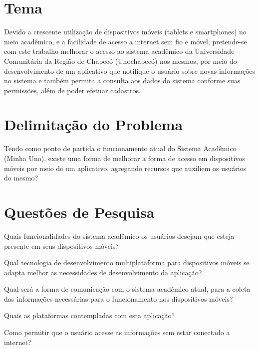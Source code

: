 \section{Tema}
Devido a crescente utilização de dispositivos móveis (tablets e smartphones) no meio acadêmico, e a facilidade de acesso a internet sem fio e móvel, pretende-se com este trabalho melhorar o acesso ao sistema acadêmico da Universidade Comunitária da Região de Chapecó (Unochapecó) nos mesmos, por meio do desenvolvimento de um aplicativo que notifique o usuário sobre novas informações no sistema e também permita a consulta aos dados do sistema conforme suas permissões, além de poder efetuar cadastros.

\section{Delimitação do Problema}
Tendo como ponto de partida o funcionamento atual do Sistema Acadêmico (Minha Uno), existe uma forma de melhorar a forma de acesso em dispositivos móveis por meio de um aplicativo, agregando recursos que auxiliem os usuários do mesmo?

\section{Questões de Pesquisa}
Quais funcionalidades do sistema acadêmico os usuários desejam que esteja presente em seus dispositivos móveis? 

Qual tecnologia de desenvolvimento multiplataforma para dispositivos móveis se adapta melhor as necessidades de desenvolvimento da aplicação? 

Qual será a forma de comunicação com o sistema acadêmico atual, para a coleta das informações necessárias para o funcionamento nos dispositivos móveis?

Quais as plataformas contempladas com esta aplicação? 

Como permitir que o usuário acesse as informações sem estar conectado a internet?